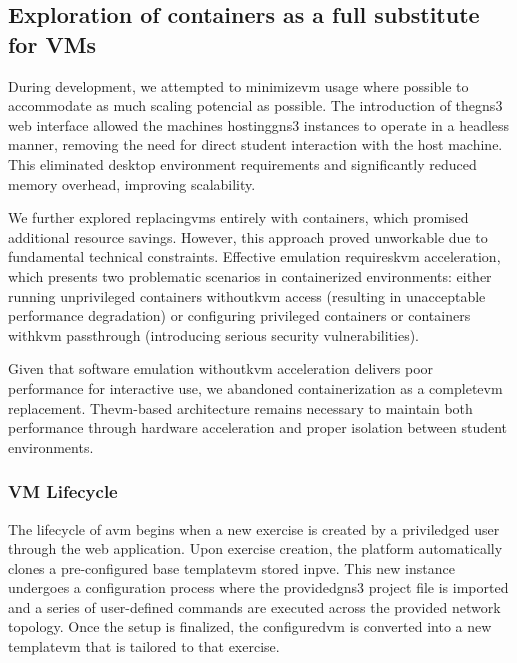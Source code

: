     \subsection{Exploration of containers as a full substitute for VMs}

        During development, we attempted to minimize\ac{vm} usage where possible to accommodate as much scaling potencial as possible. 
        The introduction of the\ac{gns3} web interface allowed the machines hosting\ac{gns3} instances to operate in a headless manner, 
        removing the need for direct student interaction with the host machine. This eliminated desktop environment requirements and 
        significantly reduced memory overhead, improving scalability.

        We further explored replacing\ac{vm}s entirely with containers, which promised additional resource savings. However, this approach 
        proved unworkable due to fundamental technical constraints. Effective emulation requires\ac{kvm} acceleration, which presents 
        two problematic scenarios in containerized environments: either running unprivileged containers without\ac{kvm} access (resulting 
        in unacceptable performance degradation) or configuring privileged containers or containers with\ac{kvm} passthrough (introducing 
        serious security vulnerabilities).

        Given that software emulation without\ac{kvm} acceleration delivers poor performance for interactive use, we abandoned containerization 
        as a complete\ac{vm} replacement. The\ac{vm}-based architecture remains necessary to maintain both performance through hardware 
        acceleration and proper isolation between student environments.

        \subsubsection{VM Lifecycle}

            The lifecycle of a\ac{vm} begins when a new exercise is created by a priviledged user through the web application. 
            Upon exercise creation, the platform automatically clones a pre-configured base template\ac{vm} stored in\ac{pve}. This new instance 
            undergoes a configuration process where the provided\ac{gns3} project file is imported and a series of user-defined commands are executed 
            across the provided network topology. Once the setup is finalized, the configured\ac{vm} is converted into a new template\ac{vm} that 
            is tailored to that exercise.

